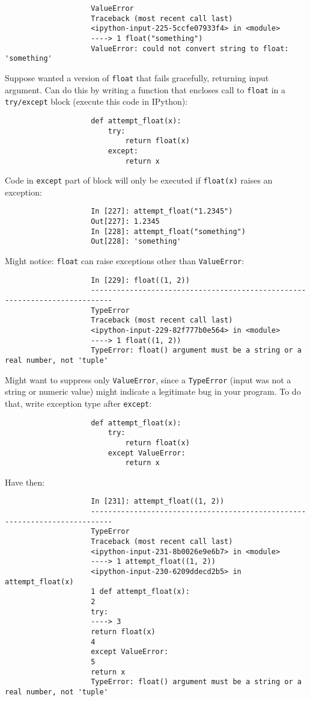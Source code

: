 \documentclass{article}
\begin{document}
\begin{enumerate}
\begin{itemize}
\begin{itemize}
\begin{itemize}
\begin{verbatim}
					ValueError
					Traceback (most recent call last)
					<ipython-input-225-5ccfe07933f4> in <module>
					----> 1 float("something")
					ValueError: could not convert string to float: 'something'
				\end{verbatim}
				Suppose wanted a version of {\tt float} that fails gracefully, returning input argument. Can do this by writing a function that encloses call to {\tt float} in a {\tt try/except} block (execute this code in IPython):
				\begin{verbatim}
					def attempt_float(x):
					    try:
					        return float(x)
					    except:
					        return x
				\end{verbatim}
				Code in {\tt except} part of block will only be executed if {\tt float(x)} raises an exception:
				\begin{verbatim}
					In [227]: attempt_float("1.2345")
					Out[227]: 1.2345
					In [228]: attempt_float("something")
					Out[228]: 'something'
				\end{verbatim}
				Might notice: {\tt float} can raise exceptions other than {\tt ValueError}:
				\begin{verbatim}
					In [229]: float((1, 2))
					---------------------------------------------------------------------------
					TypeError
					Traceback (most recent call last)
					<ipython-input-229-82f777b0e564> in <module>
					----> 1 float((1, 2))
					TypeError: float() argument must be a string or a real number, not 'tuple'
				\end{verbatim}
				Might want to suppress only {\tt ValueError}, since a {\tt TypeError} (input was not a string or numeric value) might indicate a legitimate bug in your program. To do that, write exception type after {\tt except}:
				\begin{verbatim}
					def attempt_float(x):
					    try:
					        return float(x)
					    except ValueError:
					        return x
				\end{verbatim}
				Have then:
				\begin{verbatim}
					In [231]: attempt_float((1, 2))
					---------------------------------------------------------------------------
					TypeError
					Traceback (most recent call last)
					<ipython-input-231-8b0026e9e6b7> in <module>
					----> 1 attempt_float((1, 2))
					<ipython-input-230-6209ddecd2b5> in attempt_float(x)
					1 def attempt_float(x):
					2
					try:
					----> 3
					return float(x)
					4
					except ValueError:
					5
					return x
					TypeError: float() argument must be a string or a real number, not 'tuple'

\end{verbatim}
\end{itemize}
\end{itemize}
\end{itemize}
\end{enumerate}
\end{document}
